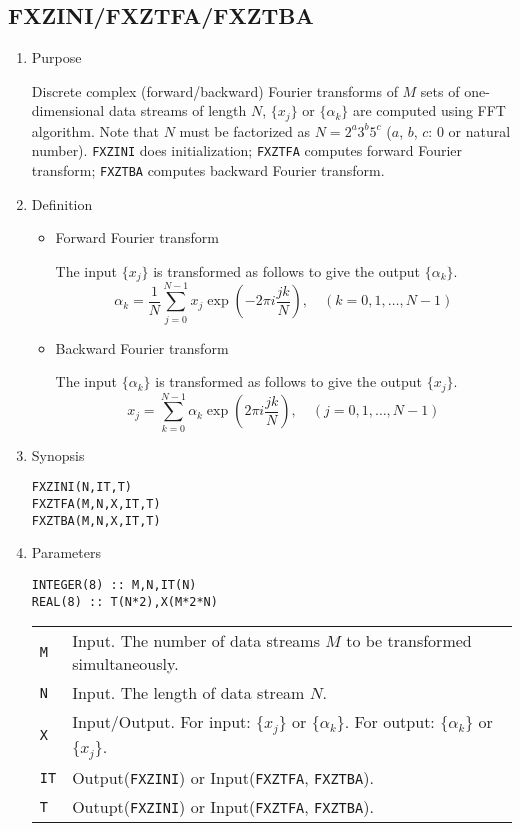 \documentclass[a4paper]{scrartcl}
\begin{document}
\subsection{FXZINI/FXZTFA/FXZTBA}
\begin{enumerate}
\item Purpose
  
   Discrete complex (forward/backward) Fourier transforms of $M$ sets of 
  one-dimensional data streams of length $N$, 
$\{x_j\}$ or $\{\alpha_k\}$ are computed using FFT algorithm.
  Note that $N$ must be factorized as
  $N=2^a3^b5^c$ ($a$, $b$, $c$: 0 or natural number).
     \texttt{FXZINI} does initialization;
     \texttt{FXZTFA} computes forward Fourier transform;
     \texttt{FXZTBA} computes backward Fourier transform.

  \item Definition
    \begin{itemize}
    \item Forward Fourier transform
      
       The input $\{x_j\}$ is transformed as follows to give 
       the output $\{\alpha_k\}$.
       \[
       \alpha_k=\frac1N\sum^{N-1}_{j=0}x_j\exp\left(-2\pi i\frac{jk}N\right),
       \quad (k=0,1,\ldots,N-1)
        \]
      \item Backward Fourier transform
        
       The input $\{\alpha_k\}$ is transformed as follows to give 
       the output $\{x_j\}$.
       \[
      x_j=\sum^{N-1}_{k=0}\alpha_k\exp\left(2\pi i\frac{jk}N\right),
       \quad (j=0,1,\ldots,N-1)
      \]

     \end{itemize}    
  \item Synopsis 

    \texttt{FXZINI(N,IT,T)}\\
    \texttt{FXZTFA(M,N,X,IT,T)}\\
    \texttt{FXZTBA(M,N,X,IT,T)}
  \item Parameters

     \vspace{-2ex}    
    
     \begin{verbatim}
INTEGER(8) :: M,N,IT(N)
REAL(8) :: T(N*2),X(M*2*N)
\end{verbatim}
     
     \vspace{-1ex}
     
    \begin{tabular}{ll}
      \texttt{M}   & Input. The number of data streams $M$
       to be transformed simultaneously.\\
      \texttt{N}   & Input. The length of data stream $N$.\\
      \texttt{X}   & Input/Output. For input: $\{x_j\}$ or $\{\alpha_k\}$.
                 For output: $\{\alpha_k\}$ or $\{x_j\}$.\\
      \texttt{IT}   & Output(\texttt{FXZINI}) or 
Input(\texttt{FXZTFA}, \texttt{FXZTBA}).\\
      \texttt{T}   & Outupt(\texttt{FXZINI}) or 
Input(\texttt{FXZTFA}, \texttt{FXZTBA}).
    \end{tabular}


\end{enumerate}
\end{document}
